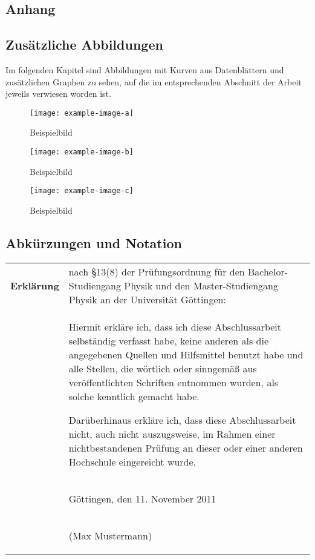 
\begin{appendix}
\printbibliography
\chapter{Anhang}
 \section{Zusätzliche Abbildungen}
 Im folgenden Kapitel sind Abbildungen mit Kurven aus Datenblättern und
 zusätzlichen Graphen zu sehen, auf die im entsprechenden Abschnitt der Arbeit
 jeweils verwiesen worden ist.

\begin{figure}
  \texttt{[image: example-image-a]}
  \caption{Beispielbild}
\end{figure}

\begin{figure}
  \texttt{[image: example-image-b]}
  \caption{Beispielbild}
\end{figure}

\begin{figure}
  \texttt{[image: example-image-c]}
  \caption{Beispielbild}
\end{figure}

 \FloatBarrier
 \newpage
\section{Abkürzungen und Notation}
\printglossary[type=\acronymtype,title=Abkürzungen]
\printglossary[title=Notation]



\end{appendix}

  \cleardoublepage\thispagestyle{empty}
  \null\vfill
  \noindent
  \begin{tabular}[t]{p{}p{}}
    \bfseries\large Erkl\"arung&nach
    \S13(8)%
    der Prüfungsordnung für den
    Bachelor-Studiengang Physik und den Master-Studiengang Physik
    an der Universität Göttingen:\\[1em]
    &Hiermit erkläre ich, dass ich diese Abschlussarbeit
    selbständig verfasst habe, keine anderen als die
    angegebenen Quellen und Hilfsmittel benutzt habe und alle Stellen,
    die wörtlich oder sinngemä\ss{} aus veröffentlichten Schriften
    entnommen wurden, als solche kenntlich gemacht habe.

    Darüberhinaus erkläre ich, dass diese Abschlussarbeit nicht, auch nicht
    auszugsweise, im Rahmen einer nichtbestandenen Prüfung an dieser oder
    einer anderen Hochschule eingereicht wurde.\\[1em]
    &\begin{center}Göttingen, den 11. November 2011\end{center}\\[1.5cm]
    &\begin{center}(Max Mustermann)\end{center}
  \end{tabular}
  \vfill
